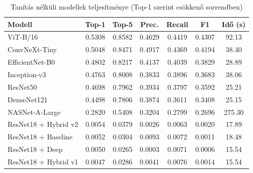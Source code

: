     \begin{table}[H]
        \centering
        \caption{Tanítás nélküli modellek teljesítménye (Top-1 szerint csökkenő sorrendben)}
        \begin{tabular}{|l|c|c|c|c|c|c|}
        \hline
        \textbf{Modell} & \textbf{Top-1} & \textbf{Top-5} & \textbf{Prec.} & \textbf{Recall} & \textbf{F1} & \textbf{Idő (s)} \\
        \hline
        ViT-B/16 & 0.5308 & 0.8582 & 0.4629 & 0.4419 & 0.4307 & 92.13 \\
        ConvNeXt-Tiny & 0.5048 & 0.8471 & 0.4917 & 0.4369 & 0.4194 & 38.40 \\
        EfficientNet-B0 & 0.4802 & 0.8217 & 0.4137 & 0.4039 & 0.3829 & 28.89 \\
        Inception-v3 & 0.4763 & 0.8008 & 0.3833 & 0.3896 & 0.3683 & 38.06 \\
        ResNet50 & 0.4698 & 0.7962 & 0.3934 & 0.3797 & 0.3592 & 25.21 \\
        DenseNet121 & 0.4498 & 0.7806 & 0.3874 & 0.3611 & 0.3408 & 25.15 \\
        NASNet-A-Large & 0.2820 & 0.5408 & 0.3204 & 0.2799 & 0.2696 & 275.30 \\
        ResNet18 + Hybrid v2 & 0.0054 & 0.0379 & 0.0026 & 0.0063 & 0.0020 & 17.89 \\
        ResNet18 + Baseline & 0.0052 & 0.0304 & 0.0093 & 0.0072 & 0.0011 & 18.48 \\
        ResNet18 + Deep & 0.0050 & 0.0265 & 0.0003 & 0.0071 & 0.0006 & 15.54 \\
        ResNet18 + Hybrid v1 & 0.0047 & 0.0286 & 0.0041 & 0.0076 & 0.0014 & 15.54 \\
        \hline
        \end{tabular}
    \end{table}
    
